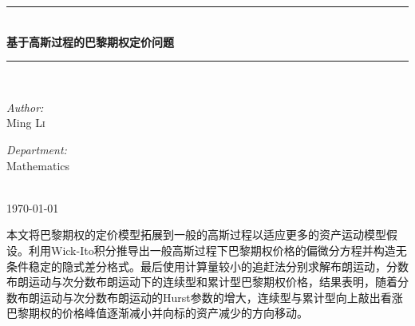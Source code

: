 \documentclass{ctexart} %
\begin{document}

\begin{titlepage}

\newcommand{\HRule}{\rule{\linewidth}{0.5mm}} %

\center %

\HRule \\[0.4cm]
{ \huge \bfseries 基于高斯过程的巴黎期权定价问题}\\[0.4cm] %
\HRule \\[1.5cm]

\begin{minipage}{0.4\textwidth}
\begin{flushleft} \large
\emph{Author:}\\
Ming \textsc{Li} %
\end{flushleft}
\end{minipage}
\begin{minipage}{0.4\textwidth}
\begin{flushright} \large
\emph{Department:} \\
Mathematics
\end{flushright}
\end{minipage}\\[4cm]

{\large \today}\\[3cm] %


\vfill %
\end{titlepage}
\newpage
本文将巴黎期权的定价模型拓展到一般的高斯过程以适应更多的资产运动模型假设。利用Wick-Ito积分推导出一般高斯过程下巴黎期权价格的偏微分方程并构造无条件稳定的隐式差分格式。最后使用计算量较小的追赶法分别求解布朗运动，分数布朗运动与次分数布朗运动下的连续型和累计型巴黎期权价格，结果表明，随着分数布朗运动与次分数布朗运动的Hurst参数的增大，连续型与累计型向上敲出看涨巴黎期权的价格峰值逐渐减小并向标的资产减少的方向移动。
\end{document}

